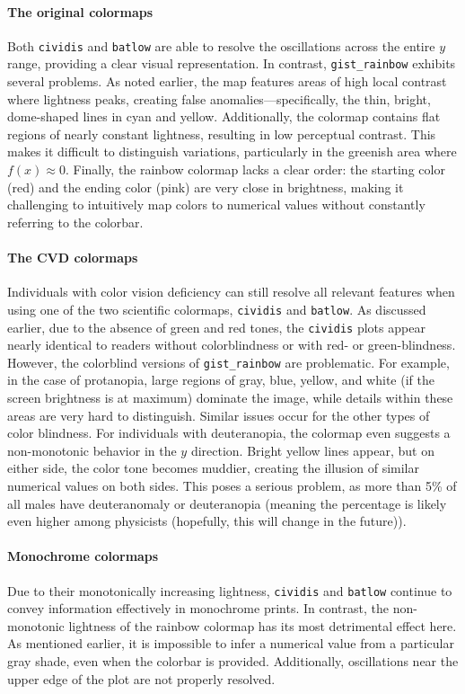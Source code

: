 \paragraph{The original colormaps}
Both \verb|cividis| and \verb|batlow| are able to resolve the oscillations across the entire $y$ range, providing a clear visual representation. In contrast, \verb|gist_rainbow| exhibits several problems. As noted earlier, the map features areas of high local contrast where lightness peaks, creating false anomalies---specifically, the thin, bright, dome-shaped lines in cyan and yellow. Additionally, the colormap contains flat regions of nearly constant lightness, resulting in low perceptual contrast. This makes it difficult to distinguish variations, particularly in the greenish area where $f(x) \approx 0$. Finally, the rainbow colormap lacks a clear order: the starting color (red) and the ending color (pink) are very close in brightness, making it challenging to intuitively map colors to numerical values without constantly referring to the colorbar.

\paragraph{The CVD colormaps} 
Individuals with color vision deficiency can still resolve all relevant features when using one of the two scientific colormaps,  \verb|cividis| and \verb|batlow|. As discussed earlier, due to the absence of green and red tones, the \verb|cividis| plots appear nearly identical to readers without colorblindness or with red- or green-blindness. However, the colorblind versions of \verb|gist_rainbow| are problematic. For example, in the case of protanopia, large regions of gray, blue, yellow, and white (if the screen brightness is at maximum) dominate the image, while details within these areas are very hard to distinguish. Similar issues occur for the other types of color blindness. For individuals with deuteranopia, the colormap even suggests a non-monotonic behavior in the $y$ direction. Bright yellow lines appear, but on either side, the color tone becomes muddier, creating the illusion of similar numerical values on both sides.
This poses a serious problem, as more than 5\% of all males have deuteranomaly or deuteranopia (meaning the percentage is likely even higher among physicists (hopefully, this will change in the future)).

\paragraph{Monochrome colormaps} Due to their monotonically increasing lightness, \verb|cividis| and \verb|batlow| continue to convey information effectively in monochrome prints. In contrast, the non-monotonic lightness of the rainbow colormap has its most detrimental effect here. As mentioned earlier, it is impossible to infer a numerical value from a particular gray shade, even when the colorbar is provided. Additionally, oscillations near the upper edge of the plot are not properly resolved.

